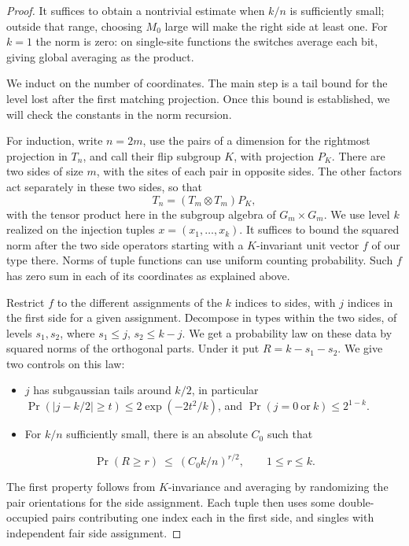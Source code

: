 \begin{proof}\label{tra:projection-deletion:level-proof}
\label{tra:projection-deletion:random-split-deletion-proof}
It suffices to obtain a nontrivial estimate when \(k/n\) is sufficiently small; outside that range, choosing \(M_0\) large will make the right side at least one. For \(k=1\) the norm is zero: on single-site functions the switches average each bit, giving global averaging as the product.

We induct on the number of coordinates. The main step is a tail bound for the level lost after the first matching projection. Once this bound is established, we will check the constants in the norm recursion.

For induction, write \(n=2m\), use the pairs of a dimension for the rightmost projection in \(T_n\), and call their flip subgroup \(K\), with projection \(P_K\). There are two sides of size \(m\), with the sites of each pair in opposite sides. The other factors act separately in these two sides, so that
\[
T_n=(T_m\otimes T_m)P_K,
\]
with the tensor product here in the subgroup algebra of \(G_m\times G_m\). We use level \(k\) realized on the injection tuples \(x=(x_1,\ldots,x_k)\). It suffices to bound the squared norm after the two side operators starting with a \(K\)-invariant unit vector \(f\) of our type there. Norms of tuple functions can use uniform counting probability. Such \(f\) has zero sum in each of its coordinates as explained above.

Restrict \(f\) to the different assignments of the \(k\) indices to sides, with \(j\) indices in the first side for a given assignment. Decompose in types within the two sides, of levels \(s_1,s_2\), where \(s_1\le j\), \(s_2\le k-j\). We get a probability law on these data by squared norms of the orthogonal parts. Under it put \(R=k-s_1-s_2\). We give two controls on this law:
\begin{itemize}
\item \(j\) has subgaussian tails around \(k/2\), in particular \(\Pr(|j-k/2|\ge t)\le 2\exp(-2t^2/k)\), and \(\Pr(j=0\ \text{or}\ k)\le 2^{1-k}\).
\item For \(k/n\) sufficiently small, there is an absolute \(C_0\) such that
\end{itemize}
\begin{equation}
\Pr(R\ge r)\ \le\ (C_0 k/n)^{r/2},\qquad 1\le r\le k .
\label{tra:projection-deletion:eq4}
\end{equation}

The first property follows from \(K\)-invariance and averaging by randomizing the pair orientations for the side assignment. Each tuple then uses some double-occupied pairs contributing one index each in the first side, and singles with independent fair side assignment.


\end{proof}
